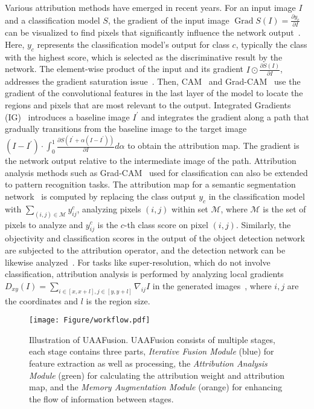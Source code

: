 Various attribution methods have emerged in recent years. 
For an input image $I$ and a classification model $S$, the gradient of the input image $\operatorname{Grad}S(I)=\frac{\partial y_{c}}{\partial I}$ can be visualized to find pixels that significantly influence the network output~\cite{DBLP:journals/jmlr/BaehrensSHKHM10,DBLP:journals/corr/SimonyanVZ13}. Here, $y_c$ represents the classification model's output for class $c$, typically the class with the highest score, which is selected as the discriminative result by the network.
The element-wise product of the input and its gradient $I \odot \frac{\partial S(I)}{\partial I}$, addresses the gradient saturation issue~\cite{DBLP:conf/icml/SundararajanTY17}. 
Then, CAM~\cite{DBLP:conf/cvpr/ZhouKLOT16} and Grad-CAM~\cite{DBLP:conf/iccv/SelvarajuCDVPB17} use the gradient of the convolutional features in the last layer of the model to locate the regions and pixels that are most relevant to the output. 
Integrated Gradients (IG)~\cite{DBLP:conf/icml/SundararajanTY17} introduces a baseline image $I^{\prime}$ and integrates the gradient along a path that gradually transitions from the baseline image to the target image $\left(I-I^{\prime}\right) \cdot \int_0^1 \frac{\partial S\left(I^{\prime}+\alpha\left(I-I^{\prime}\right)\right)}{\partial I} d \alpha$ to obtain the attribution map. 
The gradient is the network output relative to the intermediate image of the path. Attribution analysis methods such as Grad-CAM~\cite{DBLP:conf/iccv/SelvarajuCDVPB17} used for classification can also be extended to pattern recognition tasks. 
The attribution map for a semantic segmentation network~\cite{DBLP:conf/aaai/VinogradovaDM20} is computed by replacing the class output $y_c$ in the classification model with $\sum_{(i, j) \in \mathcal{M}} y_{ij}^c$, analyzing pixels $(i,j)$ within set $\mathcal{M}$, where $\mathcal{M}$ is the set of pixels to analyze and $y_{i j}^c$ is the $c$-th class score on pixel $(i,j)$. 
Similarly, the objectivity and classification scores in the output of the object detection network are subjected to the attribution operator, and the detection network can be likewise analyzed~\cite{DBLP:journals/corr/abs-2211-12108}. 
For tasks like super-resolution, which do not involve classification, attribution analysis is performed by analyzing local gradients $D_{x y}(I)=\sum_{i \in[x, x+l], j \in[y, y+l]} \nabla_{i j} I$ in the generated images~\cite{DBLP:conf/cvpr/GuD21}, where $i,j$ are the coordinates and $l$ is the region size.




\begin{figure*}[!]
	\centering
	\texttt{[image: Figure/workflow.pdf]}
	\caption{{Illustration of UAAFusion.} UAAFusion consists of multiple stages, each stage contains three parts, \textit{Iterative Fusion Module} (blue) for feature extraction as well as processing, the \textit{Attribution Analysis Module} (green) for calculating the attribution weight and attribution map, and the \textit{Memory Augmentation Module} (orange) for enhancing the flow of information between stages.}
	\label{fig:AUIF_net}
\end{figure*}
